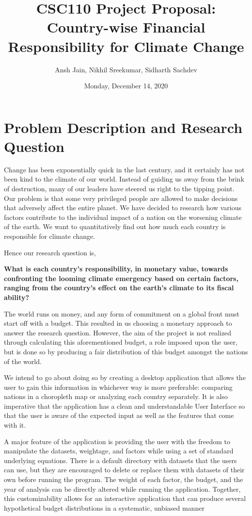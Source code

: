 \documentclass[fontsize=11pt]{article}
\title{CSC110 Project Proposal: Country-wise Financial Responsibility for Climate Change}
\author{Ansh Jain, Nikhil Sreekumar, Sidharth Sachdev}
\date{Monday, December 14, 2020}
\begin{document}
\maketitle

\section*{Problem Description and Research Question}

Change has been exponentially quick in the last century, and it certainly has not been kind to the climate of our world. Instead of guiding us away from the brink of destruction, many of our leaders have steered us right to the tipping point. Our problem is that some very privileged people are allowed to make decisions that adversely affect the entire planet. We have decided to research how various factors contribute to the individual impact of a nation on the worsening climate of the earth. We want to quantitatively find out how much each country is responsible for climate change.\newline

Hence our research question is,

\textbf{What is each country’s responsibility, in monetary value, towards confronting the looming climate emergency based on certain factors, ranging from the country’s effect on the earth’s climate to its fiscal ability?}\newline

The world runs on money, and any form of commitment on a global front must start off with a budget. This resulted in us choosing a monetary approach to answer the research question. However, the aim of the project is not realized through calculating this aforementioned budget, a role imposed upon the user, but is done so by producing a fair distribution of this budget amongst the nations of the world.\newline

We intend to go about doing so by creating a desktop application that allows the user to gain this information in whichever way is more preferable: comparing nations in a choropleth map or analyzing each country separately. It is also imperative that the application has a clean and understandable User Interface so that the user is aware of the expected input as well as the features that come with it.\newline


A major feature of the application is providing the user with the freedom to manipulate the datasets, weightage, and factors while using a set of standard underlying equations. There is a default directory with datasets that the users can use, but they are encouraged to delete or replace them with datasets of their own before running the program. The weight of each factor, the budget, and the year of analysis can be directly altered while running the application.  Together, this customizability allows for an interactive application that can produce several hypothetical budget distributions in a systematic, unbiased manner
\end{document}
